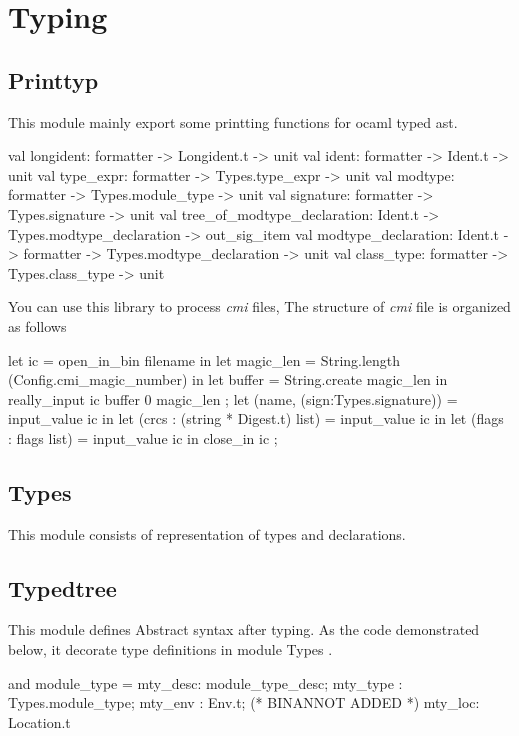 \section{Typing}


\subsection{Printtyp}
This module mainly export some printting functions for ocaml typed ast.

\begin{ocamlcode}
  val longident: formatter -> Longident.t -> unit
  val ident: formatter -> Ident.t -> unit
  val type_expr: formatter -> Types.type_expr -> unit
  val modtype: formatter -> Types.module_type -> unit
  val signature: formatter -> Types.signature -> unit
  val tree_of_modtype_declaration: Ident.t -> Types.modtype_declaration -> out_sig_item
  val modtype_declaration: Ident.t -> formatter -> Types.modtype_declaration -> unit
  val class_type: formatter -> Types.class_type -> unit
\end{ocamlcode}

You can use this library to process \textit{cmi} files, The structure
of \textit{cmi} file is organized as follows

\begin{ocamlcode}
  let ic = open_in_bin filename in
  let magic_len = String.length (Config.cmi_magic_number) in
  let buffer = String.create magic_len in
  really_input ic buffer 0 magic_len ;
  let (name, (sign:Types.signature)) = input_value ic in
  let (crcs : (string * Digest.t) list) = input_value ic in
  let (flags : flags list) = input_value ic in
  close_in ic ;
\end{ocamlcode}
\subsection{Types}

This module consists of representation of types and declarations.

\subsection{Typedtree}

This module defines Abstract syntax after typing.
As the code demonstrated below, it decorate type definitions in module
Types .
\begin{ocamlcode}
and module_type =
  { mty_desc: module_type_desc;
    mty_type : Types.module_type;
    mty_env : Env.t; (* BINANNOT ADDED *)
    mty_loc: Location.t }
\end{ocamlcode}


